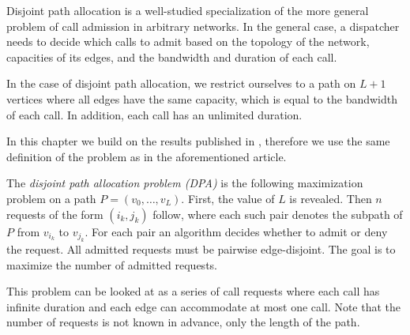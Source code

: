 Disjoint path allocation is a well-studied specialization of the more
general problem of call admission in arbitrary networks. In the general
case, a dispatcher needs to decide which calls to admit based on the
topology of the network, capacities of its edges, and the bandwidth and
duration of each call.

In the case of disjoint path allocation, we restrict ourselves to a path
on $L + 1$ vertices where all edges have the same capacity, which is equal
to the bandwidth of each call. In addition, each call has an unlimited
duration.

In this chapter we build on the results published in \cite{sofsem2014},
therefore we use the same definition of the problem as in the
aforementioned article.

\begin{definition}[DPA]\label{def:dpa}
    The \emph{disjoint path allocation problem (DPA)} is the following
    maximization problem on a path $P = (v_0, \dots, v_L)$. First, the
    value of $L$ is revealed. Then $n$ requests of the form $(i_k, j_k)$
    follow, where each such pair denotes the subpath of $P$ from $v_{i_k}$
    to $v_{j_k}$. For each pair an algorithm decides whether to admit or
    deny the request. All admitted requests must be pairwise
    edge-disjoint. The goal is to maximize the number of admitted
    requests.
\end{definition}

This problem can be looked at as a series of call requests where each call
has infinite duration and each edge can accommodate at most one call. Note
that the number of requests is not known in advance, only the length of
the path.
